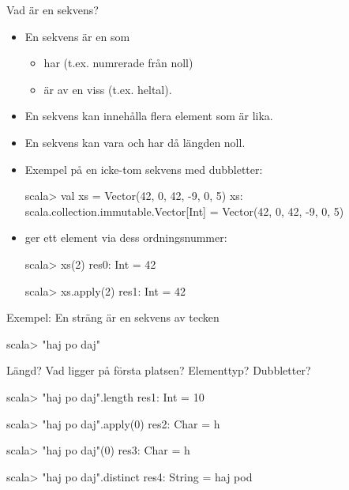 

\ifkompendium\else
{
  \frame[plain]{\centering\Huge\textbf{\color{pink}{ORDNINGEN}\\SPELAR\\ROLL}}
}
\fi


\begin{Slide}{Vad är en sekvens?}  
\begin{itemize}
\item En sekvens är en  som
  \begin{itemize}
  \item har  (t.ex. numrerade från noll)
  \item är av en viss  (t.ex. heltal).
  \end{itemize}
  \pause
\item En sekvens kan innehålla flera element som är lika.
\item En sekvens kan vara  och har då längden noll.
\item Exempel på en icke-tom sekvens med dubbletter:
\begin{REPLnonum}
scala> val xs = Vector(42, 0, 42, -9, 0, 5)
xs: scala.collection.immutable.Vector[Int] =
  Vector(42, 0, 42, -9, 0, 5)
\end{REPLnonum}
\pause
\item {} ger ett element via dess ordningsnummer:
\begin{REPLnonum}
scala> xs(2)
res0: Int = 42

scala> xs.apply(2)
res1: Int = 42
\end{REPLnonum}
\end{itemize}
\end{Slide}

\begin{Slide}{Exempel: En sträng är en sekvens av tecken}
\begin{REPLnonum}
scala> "haj po daj"
\end{REPLnonum}
Längd? 
Vad ligger på första platsen?
Elementtyp?
Dubbletter?
\pause
\begin{REPLnonum}
scala> "haj po daj".length
res1: Int = 10

scala> "haj po daj".apply(0)
res2: Char = h

scala> "haj po daj"(0)
res3: Char = h

scala> "haj po daj".distinct
res4: String = haj pod
\end{REPLnonum}

\end{Slide}


